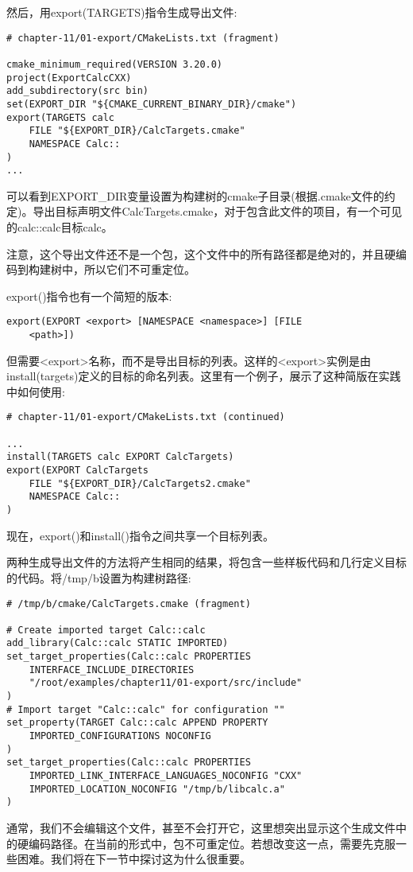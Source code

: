 然后，用export(TARGETS)指令生成导出文件:

\begin{lstlisting}[style=styleCMake]
# chapter-11/01-export/CMakeLists.txt (fragment)

cmake_minimum_required(VERSION 3.20.0)
project(ExportCalcCXX)
add_subdirectory(src bin)
set(EXPORT_DIR "${CMAKE_CURRENT_BINARY_DIR}/cmake")
export(TARGETS calc
	FILE "${EXPORT_DIR}/CalcTargets.cmake"
	NAMESPACE Calc::
)
...
\end{lstlisting}

可以看到EXPORT\_DIR变量设置为构建树的cmake子目录(根据.cmake文件的约定)。导出目标声明文件CalcTargets.cmake，对于包含此文件的项目，有一个可见的calc::calc目标calc。

注意，这个导出文件还不是一个包，这个文件中的所有路径都是绝对的，并且硬编码到构建树中，所以它们不可重定位。

export()指令也有一个简短的版本:

\begin{lstlisting}[style=styleCMake]
export(EXPORT <export> [NAMESPACE <namespace>] [FILE
	<path>])
\end{lstlisting}

但需要<export>名称，而不是导出目标的列表。这样的<export>实例是由install(targets)定义的目标的命名列表。这里有一个例子，展示了这种简版在实践中如何使用:

\begin{lstlisting}[style=styleCMake]
# chapter-11/01-export/CMakeLists.txt (continued)

...
install(TARGETS calc EXPORT CalcTargets)
export(EXPORT CalcTargets
	FILE "${EXPORT_DIR}/CalcTargets2.cmake"
	NAMESPACE Calc::
)
\end{lstlisting}

现在，export()和install()指令之间共享一个目标列表。

两种生成导出文件的方法将产生相同的结果，将包含一些样板代码和几行定义目标的代码。将/tmp/b设置为构建树路径:

\begin{lstlisting}[style=styleCMake]
# /tmp/b/cmake/CalcTargets.cmake (fragment)

# Create imported target Calc::calc
add_library(Calc::calc STATIC IMPORTED)
set_target_properties(Calc::calc PROPERTIES
	INTERFACE_INCLUDE_DIRECTORIES
	"/root/examples/chapter11/01-export/src/include"
)
# Import target "Calc::calc" for configuration ""
set_property(TARGET Calc::calc APPEND PROPERTY
	IMPORTED_CONFIGURATIONS NOCONFIG
)
set_target_properties(Calc::calc PROPERTIES
	IMPORTED_LINK_INTERFACE_LANGUAGES_NOCONFIG "CXX"
	IMPORTED_LOCATION_NOCONFIG "/tmp/b/libcalc.a"
)
\end{lstlisting}

通常，我们不会编辑这个文件，甚至不会打开它，这里想突出显示这个生成文件中的硬编码路径。在当前的形式中，包不可重定位。若想改变这一点，需要先克服一些困难。我们将在下一节中探讨这为什么很重要。












